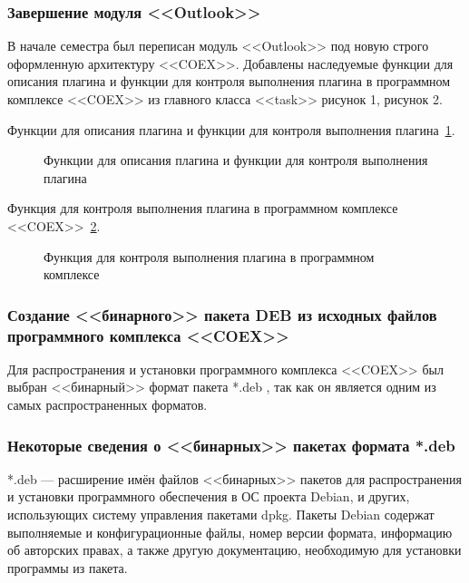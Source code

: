 \subsubsection {Завершение модуля <<Outlook>>}

В начале семестра был переписан модуль <<Outlook>> под новую строго оформленную архитектуру <<COEX>>.
Добавлены наследуемые функции для описания плагина и функции для контроля выполнения плагина в программном комплексе <<COEX>> из главного класса <<task>> рисунок 1, рисунок 2.

Функции для описания плагина и функции для контроля выполнения плагина~\ref{Outlook:Outlook}.

\begin{figure}[h!]
\caption{ Функции для описания плагина и функции для контроля выполнения плагина }
\label{Outlook:Outlook}
\end{figure}

Функция для контроля выполнения плагина в программном комплексе <<COEX>>~\ref{Outlook2:Outlook2}.

\begin{figure}[h!]
\caption{ Функция для контроля выполнения плагина в программном комплексе }
\label{Outlook2:Outlook2}
\end{figure}

\subsubsection {Создание <<бинарного>> пакета DEB из исходных файлов программного комплекса <<COEX>>}

Для распространения и установки программного комплекса <<COEX>> был выбран <<бинарный>> формат пакета *.deb , так как он является одним из самых распространенных форматов. 

\subsubsection {Некоторые сведения о <<бинарных>> пакетах формата *.deb}

*.deb --- расширение имён файлов <<бинарных>> пакетов для распространения и установки программного обеспечения в ОС проекта Debian, и других, использующих систему управления пакетами dpkg. Пакеты Debian содержат выполняемые и конфигурационные файлы, номер версии формата, информацию об авторских правах, а также другую документацию, необходимую для установки программы из пакета.

